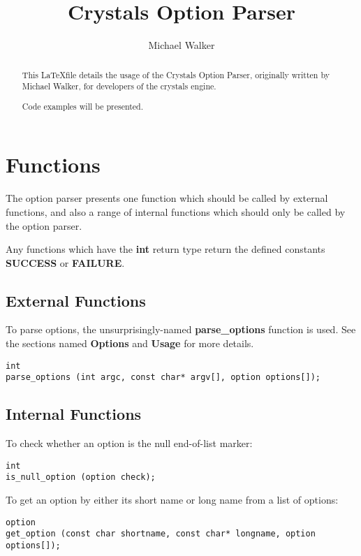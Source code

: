 \documentclass[12pt,a4paper]{article}
\author{Michael Walker}
\title{Crystals Option Parser}
\date{}
\begin{document}
\maketitle{}

\begin{abstract}
This \LaTeX file details the usage of the Crystals Option Parser, originally written by Michael Walker, for developers of the crystals engine.

Code examples will be presented.
\end{abstract}

\section{Functions}

The option parser presents one function which should be called by external functions, and also a range of internal functions which should only be called by the option parser.

Any functions which have the \textbf{int} return type return the defined constants \textbf{SUCCESS} or \textbf{FAILURE}.

\subsection{External Functions}

To parse options, the unsurprisingly-named \textbf{parse\_options} function is used. See the sections named \textbf{Options} and \textbf{Usage} for more details.

\begin{lstlisting}
int
parse_options (int argc, const char* argv[], option options[]);
\end{lstlisting}

\subsection{Internal Functions}

To check whether an option is the null end-of-list marker:

\begin{lstlisting}
int
is_null_option (option check);
\end{lstlisting}

To get an option by either its short name or long name from a list of options:

\begin{lstlisting}
option
get_option (const char shortname, const char* longname, option options[]);
\end{lstlisting}
\end{document}
